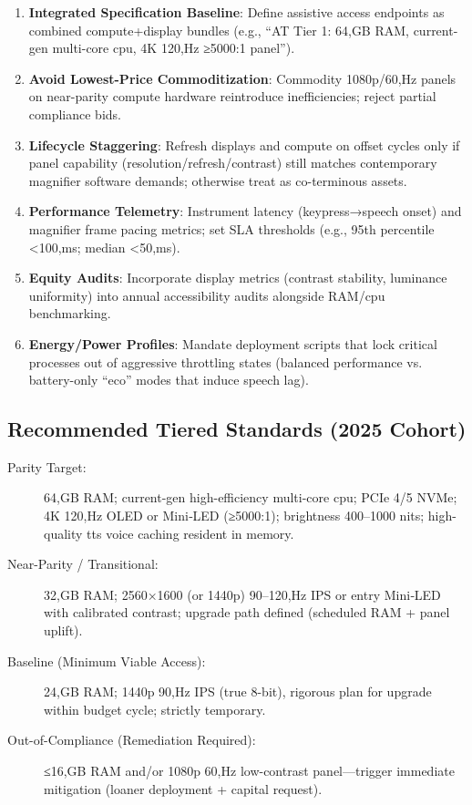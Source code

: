 \begin{enumerate}
	\item \textbf{Integrated Specification Baseline}: Define assistive access endpoints as combined compute+display bundles (e.g., “AT Tier 1: 64,GB RAM, current-gen multi-core \gls{cpu}, 4K 120,Hz ≥5000:1 panel”).
	\item \textbf{Avoid Lowest-Price Commoditization}: Commodity 1080p/60,Hz panels on near-parity compute hardware reintroduce inefficiencies; reject partial compliance bids.
	\item \textbf{Lifecycle Staggering}: Refresh displays and compute on offset cycles only if panel capability (resolution/refresh/contrast) still matches contemporary magnifier software demands; otherwise treat as co-terminous assets.
	\item \textbf{Performance Telemetry}: Instrument latency (keypress→speech onset) and magnifier frame pacing metrics; set SLA thresholds (e.g., 95th percentile <100,ms; median <50,ms).
	\item \textbf{Equity Audits}: Incorporate display metrics (contrast stability, luminance uniformity) into annual accessibility audits alongside RAM/\gls{cpu} benchmarking.
	\item \textbf{Energy/Power Profiles}: Mandate deployment scripts that lock critical processes out of aggressive throttling states (balanced performance vs. battery-only “eco” modes that induce speech lag).
\end{enumerate}

\subsection*{Recommended Tiered Standards (2025 Cohort)}

\begin{description}
	\item[Parity Target:] 64,GB RAM; current-gen high-efficiency multi-core \gls{cpu}; PCIe 4/5 NVMe; 4K 120,Hz OLED or Mini‑LED (≥5000:1); brightness 400–1000 nits; high-quality \gls{tts} voice caching resident in memory.
	\item[Near-Parity / Transitional:] 32,GB RAM; 2560×1600 (or 1440p) 90–120,Hz IPS or entry Mini‑LED with calibrated contrast; upgrade path defined (scheduled RAM + panel uplift).
	\item[Baseline (Minimum Viable Access):] 24,GB RAM; 1440p 90,Hz IPS (true 8-bit), rigorous plan for upgrade within budget cycle; strictly temporary.
	\item[Out-of-Compliance (Remediation Required):] ≤16,GB RAM and/or 1080p 60,Hz low-contrast panel—trigger immediate mitigation (loaner deployment + capital request).
\end{description}

